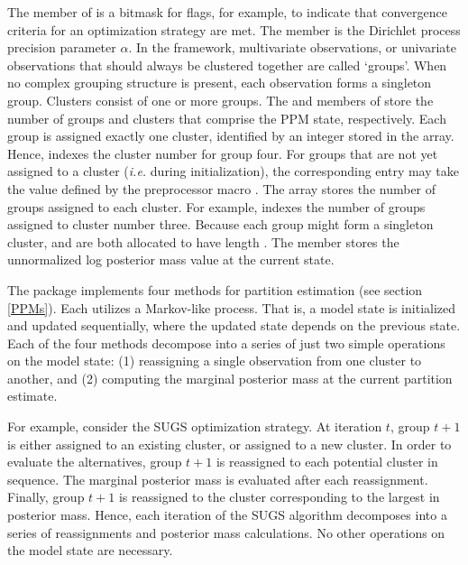 \documentclass[article, nojss]{jss}
\begin{document}
The  member of  is a bitmask for flags, for example, to indicate that convergence criteria for an optimization strategy are met. The  member is the Dirichlet process precision parameter $\alpha$. In the  framework, multivariate observations, or univariate observations that should always be clustered together are called `groups'. When no complex grouping structure is present, each observation forms a singleton group. Clusters consist of one or more groups. The  and  members of  store the number of groups and clusters that comprise the PPM state, respectively. Each group is assigned exactly one cluster, identified by an integer stored in the  array. Hence,  indexes the cluster number for group four. For groups that are not yet assigned to a cluster ({\it i.e.} during initialization), the corresponding  entry may take the value defined by the  preprocessor macro . The  array stores the number of groups assigned to each cluster. For example,  indexes the number of groups assigned to cluster number three. Because each group might form a singleton cluster,  and  are both allocated to have length . The  member stores the unnormalized log posterior mass value at the current state.

The  package implements four methods for partition estimation (see section \ref{PPMs}). Each utilizes a Markov-like process. That is, a model state is initialized and updated sequentially, where the updated state depends on the previous state. Each of the four methods decompose into a series of just two simple operations on the model state: (1) reassigning a single observation from one cluster to another, and (2) computing the marginal posterior mass at the current partition estimate.

For example, consider the SUGS optimization strategy. At iteration $t$, group $t+1$ is either assigned to an existing cluster, or assigned to a new cluster. In order to evaluate the alternatives, group $t+1$ is reassigned to each potential cluster in sequence. The marginal posterior mass is evaluated after each reassignment. Finally, group $t+1$ is reassigned to the cluster corresponding to the largest in posterior mass. Hence, each iteration of the SUGS algorithm decomposes into a series of reassignments and posterior mass calculations. No other operations on the model state are necessary. 
 
\end{document}
